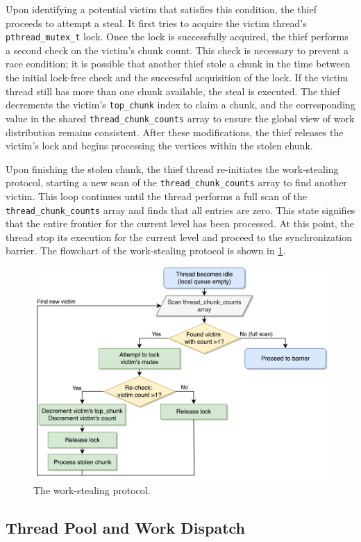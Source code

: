 Upon identifying a potential victim that satisfies this condition, the thief proceeds to attempt a steal. It first tries to acquire the victim thread's \texttt{pthread\_mutex\_t} lock. Once the lock is successfully acquired, the thief performs a second check on the victim's chunk count. This check is necessary to prevent a race condition; it is possible that another thief stole a chunk in the time between the initial lock-free check and the successful acquisition of the lock. If the victim thread still has more than one chunk available, the steal is executed. The thief decrements the victim's \texttt{top\_chunk} index to claim a chunk, and the corresponding value in the shared \texttt{thread\_chunk\_counts} array to ensure the global view of work distribution remains consistent. After these modifications, the thief releases the victim's lock and begins processing the vertices within the stolen chunk.

Upon finishing the stolen chunk, the thief thread re-initiates the work-stealing protocol, starting a new scan of the \texttt{thread\_chunk\_counts} array to find another victim. This loop continues until the thread performs a full scan of the \texttt{thread\_chunk\_counts} array and finds that all entries are zero. This state signifies that the entire frontier for the current level has been processed. At this point, the thread stop its execution for the current level and proceed to the synchronization barrier. The flowchart of the work-stealing protocol is shown in \cref{fig:workstealing}.

\begin{figure}[h]
    \centering
    \includegraphics[width=0.7\linewidth]{images/workstealing.png}
    \caption{The work-stealing protocol.}
    \label{fig:workstealing}
\end{figure}

\subsection{Thread Pool and Work Dispatch}

